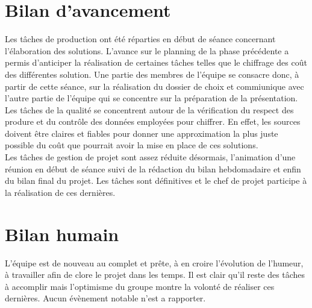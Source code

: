 
\section{Bilan d'avancement}

Les tâches de production ont été réparties en début de séance concernant l'élaboration des solutions. L'avance sur le planning de la phase précédente a permis d'anticiper la réalisation de certaines tâches telles que le chiffrage des coût des différentes solution. Une partie des membres de l'équipe se consacre donc, à partir de cette séance, sur la réalisation du dossier de choix et commiunique avec l'autre partie de l'équipe qui se concentre sur la préparation de la présentation.\\

Les tâches de la qualité se concentrent autour de la vérification du respect des produre et du contrôle des données employées pour chiffrer. En effet, les sources doivent être claires et fiables pour donner une approximation la plus juste possible du coût que pourrait avoir la mise en place de ces solutions.\\

Les tâches de gestion de projet sont assez réduite désormais, l'animation d'une réunion en début de séance suivi de la rédaction du bilan hebdomadaire et enfin du bilan final du projet. Les tâches sont définitives et le chef de projet participe à la réalisation de ces dernières.   

\section{Bilan humain}

L'équipe est de nouveau au complet et prête, à en croire l'évolution de l'humeur, à travailler afin de clore le projet dans les temps. Il est clair qu'il reste des tâches à accomplir mais l'optimisme du groupe montre la volonté de réaliser ces dernières. Aucun évènement notable n'est a rapporter.
